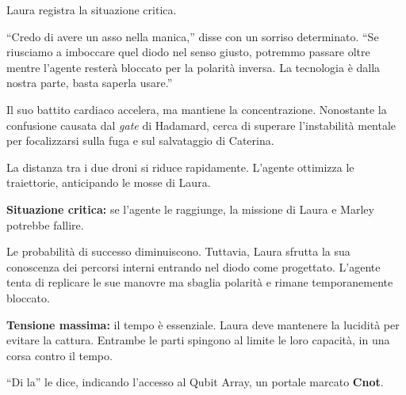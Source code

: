 Laura registra la situazione critica.

\begin{dialogue}
 \enquote{Credo di avere un asso nella manica,} disse con un sorriso determinato. \enquote{Se riusciamo a imboccare quel diodo nel senso giusto, potremmo passare oltre mentre l'agente resterà bloccato per la polarità inversa. La tecnologia è dalla nostra parte, basta saperla usare.}
\end{dialogue}

Il suo battito cardiaco accelera, ma mantiene la concentrazione. Nonostante la confusione causata dal \textit{gate} di Hadamard, cerca di superare l'instabilità mentale per focalizzarsi sulla fuga e sul salvataggio di Caterina.

La distanza tra i due droni si riduce rapidamente. L'agente ottimizza le traiettorie, anticipando le mosse di Laura.

\textbf{Situazione critica:} se l'agente le raggiunge, la missione di Laura e Marley potrebbe fallire.

Le probabilità di successo diminuiscono. Tuttavia, Laura sfrutta la sua conoscenza dei percorsi interni entrando nel diodo come progettato. L'agente tenta di replicare le sue manovre ma sbaglia polarità e rimane temporanemente bloccato.

\textbf{Tensione massima:} il tempo è essenziale. Laura deve mantenere la lucidità per evitare la cattura. Entrambe le parti spingono al limite le loro capacità, in una corsa contro il tempo.

\begin{dialogue}
 \enquote{Di la} le dice, indicando l'accesso al Qubit Array, un portale marcato \textbf{Cnot}.
\end{dialogue}
